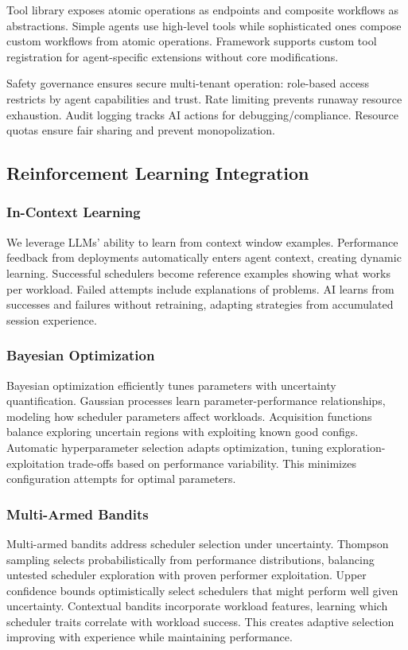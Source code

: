 Tool library exposes atomic operations as endpoints and composite workflows as abstractions. Simple agents use high-level tools while sophisticated ones compose custom workflows from atomic operations. Framework supports custom tool registration for agent-specific extensions without core modifications.

Safety governance ensures secure multi-tenant operation: role-based access restricts by agent capabilities and trust. Rate limiting prevents runaway resource exhaustion. Audit logging tracks AI actions for debugging/compliance. Resource quotas ensure fair sharing and prevent monopolization.

\subsection{Reinforcement Learning Integration}

\subsubsection{In-Context Learning}
We leverage LLMs' ability to learn from context window examples. Performance feedback from deployments automatically enters agent context, creating dynamic learning. Successful schedulers become reference examples showing what works per workload. Failed attempts include explanations of problems. AI learns from successes and failures without retraining, adapting strategies from accumulated session experience.

\subsubsection{Bayesian Optimization}
Bayesian optimization efficiently tunes parameters with uncertainty quantification. Gaussian processes learn parameter-performance relationships, modeling how scheduler parameters affect workloads. Acquisition functions balance exploring uncertain regions with exploiting known good configs. Automatic hyperparameter selection adapts optimization, tuning exploration-exploitation trade-offs based on performance variability. This minimizes configuration attempts for optimal parameters.

\subsubsection{Multi-Armed Bandits}
Multi-armed bandits address scheduler selection under uncertainty. Thompson sampling selects probabilistically from performance distributions, balancing untested scheduler exploration with proven performer exploitation. Upper confidence bounds optimistically select schedulers that might perform well given uncertainty. Contextual bandits incorporate workload features, learning which scheduler traits correlate with workload success. This creates adaptive selection improving with experience while maintaining performance.

